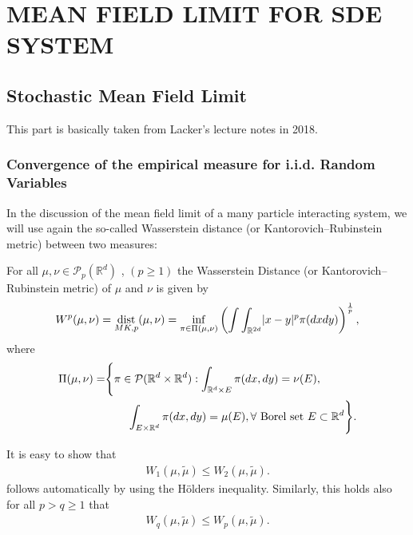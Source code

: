 \newpage
\chapter{MEAN FIELD LIMIT FOR SDE SYSTEM}





\section{Stochastic Mean Field Limit}

This part is basically taken from Lacker's lecture notes in 2018.

\subsection{Convergence of the empirical measure for i.i.d. Random Variables}

In the discussion of the mean field limit of a many particle interacting system, we will use again the so-called Wasserstein distance (or  Kantorovich–Rubinstein metric) between two measures:
\begin{definition}
  For all $\mu , \nu  \in  \mathcal{P}_p(\mathbb{R}^{d} )$  , $(p\ge 1) $ the Wasserstein Distance  (or  Kantorovich–Rubinstein metric) of $\mu $ and $\nu $ is given by 
  \begin{align*}
    W^{p}(\mu ,\nu ) = \operatorname*{dist}_{MK,p}(\mu ,\nu ) = \inf_{\pi \in  \Pi(\mu ,\nu )} \left( \int \int_{\mathbb{R}^{2d} } \lvert x-y\rvert^{p} \pi(dxdy) \right)^{\frac{1}{p}}  
  ,\end{align*}
  where  
  \begin{align*}
    \Pi(\mu ,\nu ) = &\Bigg\{\pi \in \mathcal{P}(\mathbb{R}^{d} \times  \mathbb{R}^{d}  ) : 
    \int_{\mathbb{R}^{d}\times E } \pi(dx,dy) = \nu(E), \\
     &\qquad \int_{E \times  \mathbb{R}^{d} } \pi(dx,dy) = \mu(E), \forall \mbox{ Borel set } E\subset\mathbb{R}^d\Bigg\}  
  .\end{align*}
\end{definition}
\begin{remark}
 It is easy to show that
 \begin{align*}
   W_1(\mu ,\tilde{\mu } ) \le  W_{2}(\mu ,\tilde{\mu } )
 .\end{align*}
 follows automatically by using the Hölders inequality. Similarly, this holds also for all $p>q\geq 1$ that
  \begin{align*}
   W_q(\mu ,\tilde{\mu } ) \le  W_{p}(\mu ,\tilde{\mu } )
 .\end{align*}
\end{remark}

